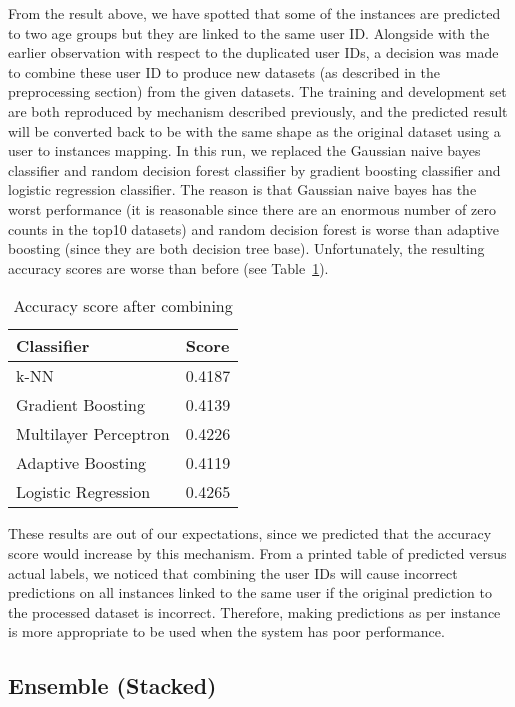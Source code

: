 \documentclass[10pt]{article}
\begin{document}
From the result above, we have spotted that some of the instances are predicted to two age groups but they are linked to the same user ID. Alongside with the earlier observation with respect to the duplicated user IDs, a decision was made to combine these user ID to produce new datasets (as described in the preprocessing section) from the given datasets. The training and development set are both reproduced by mechanism described previously, and the predicted result will be converted back to be with the same shape as the original dataset using a user to instances mapping. In this run, we replaced the Gaussian naive bayes classifier and random decision forest classifier by gradient boosting classifier and logistic regression classifier. The reason is that Gaussian naive bayes has the worst performance (it is reasonable since there are an enormous number of zero counts in the top10 datasets) and random decision forest is worse than adaptive boosting (since they are both decision tree base). Unfortunately, the resulting accuracy scores are worse than before (see Table~\ref{table2}).
\begin{table}[ht]
\begin{center}
\begin{tabular}{|l|l|}
    \hline
    Classifier & Score\\
    \hline\hline
    k-NN & 0.4187\\
    Gradient Boosting & 0.4139\\
    Multilayer Perceptron  & 0.4226\\
    Adaptive Boosting & 0.4119\\
    Logistic Regression & 0.4265\\
    \hline
\end{tabular}
\caption{Accuracy score after combining}\label{table2}
\end{center}
\end{table}
These results are out of our expectations, since we predicted that the accuracy score would increase by this mechanism. From a printed table of predicted versus actual labels, we noticed that combining the user IDs will cause incorrect predictions on all instances linked to the same user if the original prediction to the processed dataset is incorrect. Therefore, making predictions as per instance is more appropriate to be used when the system has poor performance.

\subsection{Ensemble (Stacked)}
\justify
\end{document}
